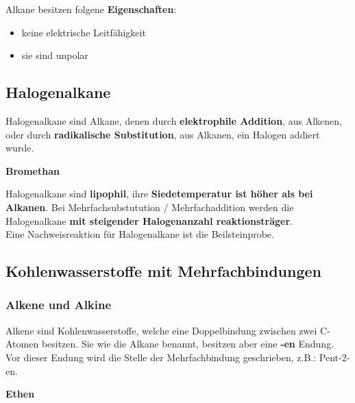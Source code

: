 \documentclass[a4paper]{article}
\begin{document}
Alkane besitzen folgene \textbf{Eigenschaften}:\\
\begin{itemize}
    \item{keine elektrische Leitfähigkeit}
    \item {sie sind unpolar}\\[1cm]
\end{itemize}


\subsection{Halogenalkane}

Halogenalkane sind Alkane, denen durch \textbf{elektrophile Addition}, aus Alkenen, oder durch
\textbf{radikalische Substitution}, aus Alkanen, ein Halogen addiert wurde. \\

\begin{center}
     \hspace{1cm} \textbf{Bromethan}\\[0,5cm]
\end{center}

Halogenalkane sind \textbf{lipophil}, ihre \textbf{Siedetemperatur ist höher als bei Alkanen}.
Bei Mehrfachsubstutution / Mehrfachaddition werden die Halogenalkane \textbf{mit steigender Halogenanzahl reaktionsträger}.\\

Eine Nachweisreaktion für Halogenalkane ist die Beilsteinprobe.



\subsection{Kohlenwasserstoffe mit Mehrfachbindungen}
\subsubsection{Alkene und Alkine}

Alkene sind Kohlenwasserstoffe, welche eine Doppelbindung zwischen zwei C-Atomen besitzen.
Sie wie die Alkane benannt, besitzen aber eine \textbf{-en} Endung. Vor dieser Endung wird die Stelle der Mehrfachbindung geschrieben,
z.B.: Pent-2-en.\\

\begin{center}
     \hspace{1cm} \textbf{Ethen}\\[0,5cm]
\end{center}
\end{document}
